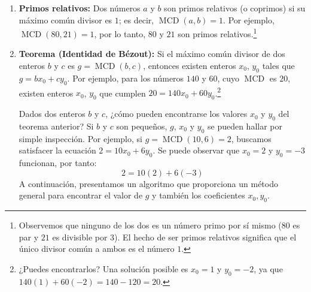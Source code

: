 \begin{enumerate}
    \textbf{Ejemplo:} Sean $a=12$ y $b=48$. Hallamos el conjunto de divisores de cada número:
    \[ D(12)=\{1,2,3,4,6,12\} \]
    \[ D(48)=\{1,2,3,4,6,8,12,16,24,48\} \]
    Hacemos la intersección entre los conjuntos:
    \[ D(12)\cap D(48)=\{1,2,3,4,6,\fbox{12}\} \]
    El máximo valor de este conjunto corresponde al $\operatorname{MCD}(12,48)=12$. Es claro que $12 \mid 12$ y que $12 \mid 48$. En general, esto siempre se cumple: $\operatorname{MCD}(a,b) \mid a$ y $\operatorname{MCD}(a,b) \mid b$.

    \textbf{Ejemplo:} Algunas veces, cuando hemos realizado la factorización prima de los números, escogemos los factores primos \textit{comunes} con su \textit{menor exponente}. El producto de ellos corresponderá con el máximo común divisor.
    Así, para $90=2\cdot 3^2\cdot 5$ y $120=2^3\cdot 3\cdot 5$, tomamos los factores comunes con el menor exponente ($2^1$, $3^1$ y $5^1$). Por lo tanto:
    \[ \operatorname{MCD}(90,120)=2\cdot 3\cdot 5 =30 \]

    \item \textbf{Primos relativos:} Dos números $a$ y $b$ son primos relativos (o coprimos) si su máximo común divisor es $1$; es decir, $\operatorname{MCD}(a,b)=1$. Por ejemplo, $\operatorname{MCD}(80,21)= 1$, por lo tanto, $80$ y $21$ son primos relativos.\footnote{Observemos que ninguno de los dos es un número primo por sí mismo ($80$ es par y $21$ es divisible por $3$). El hecho de ser primos relativos significa que el único divisor común a ambos es el número $1$.}

    \item \textbf{Teorema (Identidad de Bézout):} Si el máximo común divisor de dos enteros $b$ y $c$ es $g=\operatorname{MCD}(b,c)$, entonces existen enteros $x_0$, $y_0$ tales que $g=bx_0+cy_0$.
    Por ejemplo, para los números $140$ y $60$, cuyo $\operatorname{MCD}$ es $20$, existen enteros $x_0$, $y_0$ que cumplen $20=140x_0+60y_0$.\footnote{¿Puedes encontrarlos? Una solución posible es $x_0=1$ y $y_0=-2$, ya que $140(1)+60(-2) = 140-120=20$.}

    Dados dos enteros $b$ y $c$, ¿cómo pueden encontrarse los valores $x_0$ y $y_0$ del teorema anterior? Si $b$ y $c$ son pequeños, $g$, $x_0$ y $y_0$ se pueden hallar por simple inspección.
    Por ejemplo, si $g=\operatorname{MCD}(10,6)=2$, buscamos satisfacer la ecuación $2=10x_0+6y_0$. Se puede observar que $x_0=2$ y $y_0=-3$ funcionan, por tanto:
    \[ 2=10(2)+6(-3) \]
    A continuación, presentamos un algoritmo que proporciona un método general para encontrar el valor de $g$ y también los coeficientes $x_0, y_0$.


\end{enumerate}
